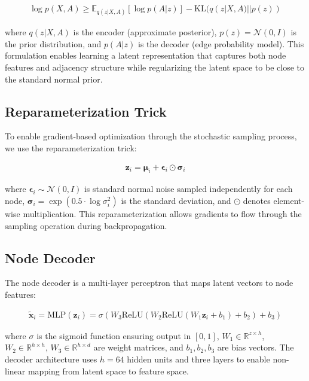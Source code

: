 \documentclass[12pt]{article}
\begin{document}
\begin{align}
\log p(X, A) \geq \mathbb{E}_{q(z|X,A)}[\log p(A|z)] - \text{KL}(q(z|X,A) || p(z))
\end{align}

where $q(z|X,A)$ is the encoder (approximate posterior), $p(z) = \mathcal{N}(0, I)$ is the prior distribution, and $p(A|z)$ is the decoder (edge probability model). This formulation enables learning a latent representation that captures both node features and adjacency structure while regularizing the latent space to be close to the standard normal prior.

\subsection{Reparameterization Trick}

To enable gradient-based optimization through the stochastic sampling process, we use the reparameterization trick:

\begin{align}
\mathbf{z}_i = \boldsymbol{\mu}_i + \boldsymbol{\epsilon}_i \odot \boldsymbol{\sigma}_i
\end{align}

where $\boldsymbol{\epsilon}_i \sim \mathcal{N}(0, I)$ is standard normal noise sampled independently for each node, $\boldsymbol{\sigma}_i = \exp(0.5 \cdot \log\sigma^2_i)$ is the standard deviation, and $\odot$ denotes element-wise multiplication. This reparameterization allows gradients to flow through the sampling operation during backpropagation.

\subsection{Node Decoder}

The node decoder is a multi-layer perceptron that maps latent vectors to node features:

\begin{align}
\tilde{\mathbf{x}}_i = \text{MLP}(\mathbf{z}_i) = \sigma(W_3 \text{ReLU}(W_2 \text{ReLU}(W_1 \mathbf{z}_i + b_1) + b_2) + b_3)
\end{align}

where $\sigma$ is the sigmoid function ensuring output in $[0,1]$, $W_1 \in \mathbb{R}^{z \times h}$, $W_2 \in \mathbb{R}^{h \times h}$, $W_3 \in \mathbb{R}^{h \times d}$ are weight matrices, and $b_1, b_2, b_3$ are bias vectors. The decoder architecture uses $h=64$ hidden units and three layers to enable non-linear mapping from latent space to feature space.
\end{document}
